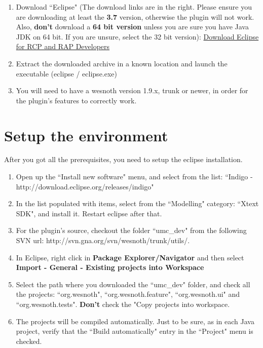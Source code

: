 \documentclass[10pt]{article}
\begin{document}
\begin{enumerate}
\item Download ``Eclipse" (The download links are in the right. Please ensure you are downloading at least the \textbf{3.7} version, otherwise the plugin will not work. Also, \textbf{don't} download a \textbf{64 bit version} unless you are sure you have Java JDK on 64 bit. If you are unsure, select the 32 bit version):  \href{http://eclipse.org/downloads/packages/eclipse-rcp-and-rap-developers/indigor}{Download Eclipse for RCP and RAP Developers}

\item Extract the downloaded archive in a known location and launch the executable (eclipse / eclipse.exe)

\item You will need to have a wesnoth version 1.9.x, trunk or newer, in order for the plugin's features to correctly work.
\end{enumerate}

\section{Setup the environment}
After you got all the prerequisites, you need to setup the eclipse installation.

\begin{enumerate}
\item Open up the ``Install new software" menu, and select from the list: ``Indigo - http://download.eclipse.org/releases/indigo"

\item In the list populated with items, select from the ``Modelling" category: ``Xtext SDK", and install it. Restart eclipse after that.

\item For the plugin's source, checkout the folder ``umc\_dev" from the following SVN url: http://svn.gna.org/svn/wesnoth/trunk/utils/.

\item In Eclipse, right click in \textbf{Package Explorer/Navigator} and then select \textbf{Import - General - Existing projects into Workspace}

\item Select the path where you downloaded the ``umc\_dev" folder, and check all the projects: ``org.wesnoth", ``org.wesnoth.feature", ``org.wesnoth.ui" and ``org.wesnoth.tests". \textbf{Don't} check the "Copy projects into workspace.

\item The projects will be compiled automatically. Just to be sure, as in each Java project, verify that the ``Build automatically" entry in the ``Project" menu is checked.
\end{enumerate}
\end{document}
